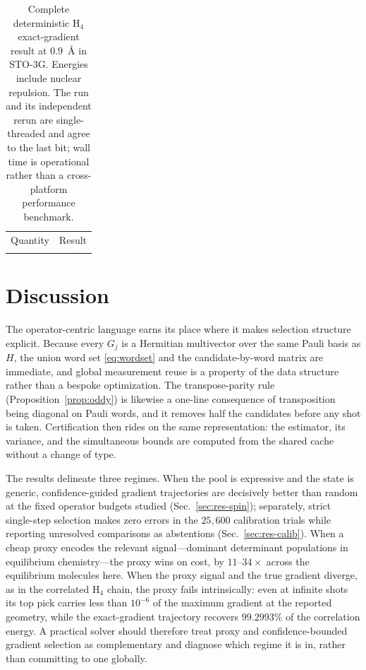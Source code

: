 \documentclass[aps,pra,reprint,superscriptaddress,nofootinbib,floatfix]{revtex4-2}
\begin{document}
\begin{table}[t]
\caption{Complete deterministic H$_4$ exact-gradient result at $0.9$~\AA{} in STO-3G. Energies include nuclear repulsion. The run and its independent rerun are single-threaded and agree to the last bit; wall time is operational rather than a cross-platform performance benchmark.}
\label{tab:h4full}
\centering
\footnotesize
\begin{ruledtabular}
\begin{tabular}{lr}
Quantity & Result\\
\colrule

\end{tabular}
\end{ruledtabular}
\end{table}

\section{Discussion}
\label{sec:discussion}

The operator-centric language earns its place where it makes selection structure explicit. Because every $G_j$ is a Hermitian multivector over the same Pauli basis as $H$, the union word set \eqref{eq:wordset} and the candidate-by-word matrix are immediate, and global measurement reuse is a property of the data structure rather than a bespoke optimization. The transpose-parity rule (Proposition~\ref{prop:oddy}) is likewise a one-line consequence of transposition being diagonal on Pauli words, and it removes half the candidates before any shot is taken. Certification then rides on the same representation: the estimator, its variance, and the simultaneous bounds are computed from the shared cache without a change of type.

The results delineate three regimes. When the pool is expressive and the state is generic, confidence-guided gradient trajectories are decisively better than random at the fixed operator budgets studied (Sec.~\ref{sec:res-spin}); separately, strict single-step selection makes zero errors in the $25{,}600$ calibration trials while reporting unresolved comparisons as abstentions (Sec.~\ref{sec:res-calib}). When a cheap proxy encodes the relevant signal---dominant determinant populations in equilibrium chemistry---the proxy wins on cost, by $11$--$34\times$ across the equilibrium molecules here. When the proxy signal and the true gradient diverge, as in the correlated H$_4$ chain, the proxy fails intrinsically: even at infinite shots its top pick carries less than $10^{-6}$ of the maximum gradient at the reported geometry, while the exact-gradient trajectory recovers $99.2993\%$ of the correlation energy. A practical solver should therefore treat proxy and confidence-bounded gradient selection as complementary and diagnose which regime it is in, rather than committing to one globally.
\end{document}
